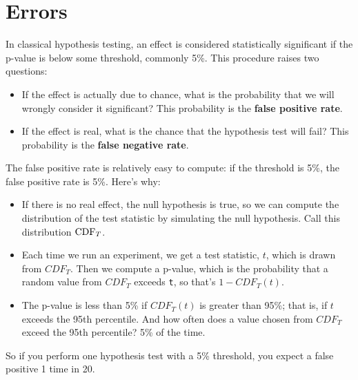 \documentclass[12pt]{book}
\begin{document}
\section{Errors}

In classical hypothesis testing, an effect is considered statistically
significant if the p-value is below some threshold, commonly 5\%.
This procedure raises two questions:
 

\begin{itemize}

\item If the effect is actually due to chance, what is the probability
that we will wrongly consider it significant?  This
probability is the {\bf false positive rate}.

\item If the effect is real, what is the chance that the hypothesis
test will fail?  This probability is the {\bf false negative rate}.

\end{itemize}

The false positive rate is relatively easy to compute: if the
threshold is 5\%, the false positive rate is 5\%.  Here's why:

\begin{itemize}

\item If there is no real effect, the null hypothesis is true, so we
  can compute the distribution of the test statistic by simulating the
  null hypothesis.  Call this distribution $\mathrm{CDF}_T$.

\item Each time we run an experiment, we get a test statistic, $t$,
  which is drawn from $CDF_T$.  Then we compute a p-value, which is
  the probability that a random value from $CDF_T$ exceeds \verb"t",
  so that's $1 - CDF_T(t)$.

\item The p-value is less than 5\% if $CDF_T(t)$ is greater
  than 95\%; that is, if $t$ exceeds the 95th percentile.
  And how often does a value chosen from $CDF_T$ exceed
  the 95th percentile?  5\% of the time.

\end{itemize}

So if you perform one hypothesis test with a 5\% threshold, you expect
a false positive 1 time in 20.
\end{document}
